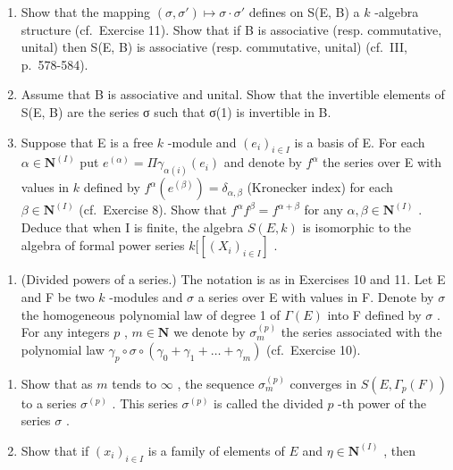 \begin{enumerate}
\def\labelenumi{\alph{enumi})}
\item
  Show that the mapping \((\sigma, \sigma') \mapsto \sigma \cdot \sigma'\) defines on S(E, B) a \(k\) -algebra structure (cf.~Exercise 11). Show that if B is associative (resp. commutative, unital) then S(E, B) is associative (resp. commutative, unital) (cf.~III, p.~578-584).
\item
  Assume that B is associative and unital. Show that the invertible elements of S(E, B) are the series σ such that σ(1) is invertible in B.
\item
  Suppose that E is a free \(k\) -module and \((e_i)_{i \in I}\) is a basis of E. For each \(\alpha \in \mathbf{N}^{(I)}\) put \(e^{(\alpha)} = \Pi \gamma_{\alpha(i)}(e_i)\) and denote by \(f^\alpha\) the series over E with values in \(k\) defined by \(f^\alpha(e^{(\beta)}) = \delta_{\alpha, \beta}\) (Kronecker index) for each \(\beta \in \mathbf{N}^{(I)}\) (cf.~Exercise 8). Show that \(f^\alpha f^\beta = f^{\alpha + \beta}\) for any \(\alpha, \beta \in \mathbf{N}^{(I)}\) . Deduce that when I is finite, the algebra \(S(E, k)\) is isomorphic to the algebra of formal power series \(k[[(X_i)_{i \in I}]\) .
\end{enumerate}

\begin{enumerate}
\def\labelenumi{\arabic{enumi})}
\setcounter{enumi}{12}
\tightlist
\item
  (Divided powers of a series.) The notation is as in Exercises 10 and 11. Let E and F be two \(k\) -modules and \(\sigma\) a series over E with values in F. Denote by \(\sigma\) the homogeneous polynomial law of degree 1 of \(\Gamma(E)\) into F defined by \(\sigma\) . For any integers \(p\) , \(m \in \mathbf{N}\) we denote by \(\sigma_m^{(p)}\) the series associated with the polynomial law \(\gamma_p \circ \sigma \circ (\gamma_0 + \gamma_1 + \ldots + \gamma_m)\) (cf.~Exercise 10).
\end{enumerate}

\begin{enumerate}
\def\labelenumi{\alph{enumi})}
\item
  Show that as \(m\) tends to \(\infty\) , the sequence \(\sigma_{m}^{(p)}\) converges in \(S(E, \Gamma_p(F))\) to a series \(\sigma^{(p)}\) . This series \(\sigma^{(p)}\) is called the divided \(p\) -th power of the series \(\sigma\) .
\item
  Show that if \((x_{i})_{i\in I}\) is a family of elements of \(E\) and \(\eta \in \mathbf{N}^{(I)}\) , then
\end{enumerate}

